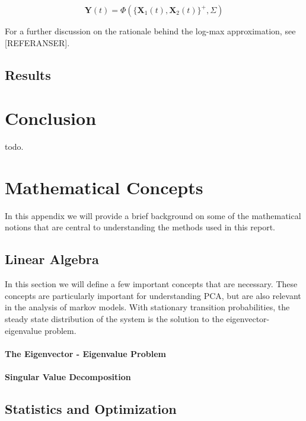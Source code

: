 \documentclass[11pt, oneside, a4paper]{report}
\begin{document}
\begin{equation}
  \mathbf{Y}(t) = \Phi(\{\mathbf{X}_1(t), \mathbf{X}_2(t)\}^{+}, \Sigma)
\end{equation}

For a further discussion on the rationale behind the log-max
approximation, see [REFERANSER].




\section{Results}



\chapter{Conclusion}

todo.


\appendix
\chapter{Mathematical Concepts}

In this appendix we will provide a brief background on some of the mathematical notions that are central to understanding the methods used in this report. 

\section{Linear Algebra}

In this section we will define a few important concepts that are
necessary. These concepts are particularly important for understanding
PCA, but are also relevant in the analysis of markov models. With
stationary transition probabilities, the steady state distribution of
the system is the solution to the eigenvector-eigenvalue problem.

\subsubsection{The Eigenvector - Eigenvalue Problem}

\subsubsection{Singular Value Decomposition}


\section{Statistics and Optimization}
\end{document}
